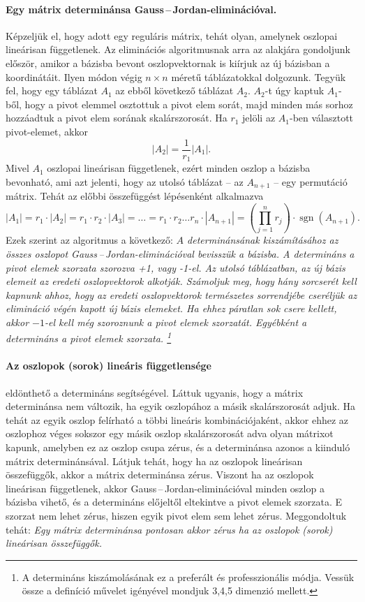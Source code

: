 \documentclass[9pt, a4paper, showtrims]{memoir}
\theoremstyle{plain}
\theoremstyle{remark}
\theoremstyle{definition}
\DeclareMathOperator{\sgn}{sgn}
\begin{document}
\paragraph{Egy mátrix determinánsa Gauss\,--\,Jordan-eliminációval.}
Képzeljük el, hogy adott egy reguláris mátrix, tehát olyan, amelynek oszlopai lineárisan függetlenek.
Az eliminációs algoritmusnak arra az alakjára gondoljunk először, amikor a bázisba bevont oszlopvektornak
is kiírjuk az új bázisban a koordinátáit.
Ilyen módon végig $n\times n$ méretű táblázatokkal dolgozunk.
Tegyük fel, hogy egy táblázat $A_1$ az ebből következő táblázat $A_2$.
$A_2$-t úgy kaptuk $A_1$-ből, hogy a pivot elemmel osztottuk a pivot elem sorát,
majd minden más sorhoz hozzáadtuk a pivot elem sorának skalárszorosát.
Ha $r_1$ jelöli az $A_1$-ben választott pivot-elemet, akkor
\[
	|A_2|=\frac{1}{r_1}|A_1|.
\]
Mivel $A_1$ oszlopai lineárisan függetlenek, ezért minden oszlop a bázisba bevonható,
ami azt jelenti, hogy az utolsó táblázat -- az $A_{n+1}$ -- egy permutáció mátrix.
Tehát az előbbi összefüggést lépésenként alkalmazva
\[
	|A_1|=r_1\cdot |A_2|=r_1\cdot r_2\cdot |A_3|=\dots=r_1\cdot r_2\dots r_{n}\cdot|A_{n+1}|=\left(\prod_{j=1}^nr_j  \right)\cdot\sgn(A_{n+1}).
\]
Ezek szerint az algoritmus a következő:
\emph{
	$A$ determinánsának kiszámításához az összes oszlopot Gauss\,--\,Jordan-eliminációval bevisszük a bázisba.
	A determináns a pivot elemek szorzata szorozva +1, vagy -1-el.
	Az utolsó táblázatban, az új bázis elemeit az eredeti oszlopvektorok alkotják.
	Számoljuk meg, hogy hány sorcserét kell kapnunk ahhoz, hogy az eredeti oszlopvektorok természetes sorrendjébe cseréljük az elimináció
	végén kapott új bázis elemeket.
	Ha ehhez páratlan sok csere kellett, akkor $-1$-el kell még szoroznunk a pivot elemek szorzatát.
	Egyébként a determináns a pivot elemek szorzata.
	\footnote{
		A determináns kiszámolásának ez a preferált és professzionális módja.
		Vessük össze a definíció művelet igényével mondjuk 3,4,5 dimenzió mellett.}
}

\paragraph{Az oszlopok (sorok) lineáris függetlensége} eldönthető a determináns segítségével.
Láttuk ugyanis, hogy a mátrix determinánsa nem változik, ha egyik oszlopához a másik skalárszorosát adjuk.
Ha tehát az egyik oszlop felírható a többi lineáris kombinációjaként,
akkor ehhez az oszlophoz véges sokszor egy másik oszlop skalárszorosát adva olyan mátrixot kapunk,
amelyben ez az oszlop csupa zérus, és a determinánsa azonos a kiinduló mátrix determinánsával.
Látjuk tehát, hogy ha az oszlopok lineárisan összefüggők, akkor a mátrix determinánsa zérus.
Viszont ha az oszlopok lineárisan függetlenek,
akkor Gauss\,--\,Jordan-eliminációval minden oszlop a bázisba vihető, és a determináns előjeltől eltekintve a pivot elemek szorzata.
E szorzat nem lehet zérus, hiszen egyik pivot elem sem lehet zérus.
Meggondoltuk tehát:
\emph{
	Egy mátrix determinánsa pontosan akkor zérus ha az oszlopok (sorok) lineárisan összefüggők.
}
\end{document}

